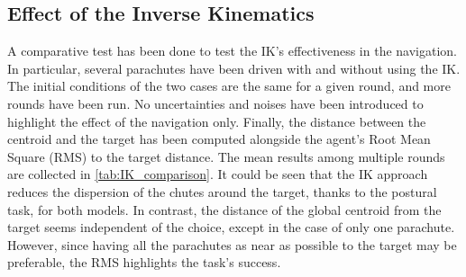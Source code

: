 \subsection{Effect of the Inverse Kinematics}
A comparative test has been done to test the IK's effectiveness in the navigation. In particular, several parachutes have been driven with and without using the IK. The initial conditions of the two cases are the same for a given round, and more rounds have been run. No uncertainties and noises have been introduced to highlight the effect of the navigation only. Finally, the distance between the centroid and the target has been computed alongside the agent's Root Mean Square (RMS) to the target distance. The mean results among multiple rounds are collected in \autoref{tab:IK_comparison}.
It could be seen that the IK approach reduces the dispersion of the chutes around the target, thanks to the postural task, for both models. In contrast, the distance of the global centroid from the target seems independent of the choice, except in the case of only one parachute. However, since having all the parachutes as near as possible to the target may be preferable, the RMS highlights the task's success.


